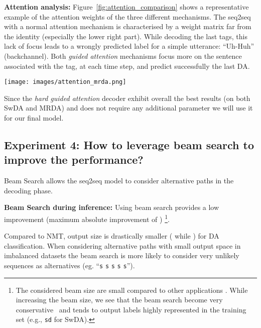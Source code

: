 \documentclass[letterpaper]{article} \usepackage{aaai20}  \usepackage{times}  \usepackage{helvet} \usepackage{courier}  \usepackage[hyphens]{url}  \usepackage{graphicx} \urlstyle{rm} \def\UrlFont{\rm}  \usepackage{graphicx}  \frenchspacing  \setlength{\pdfpagewidth}{8.5in}  \setlength{\pdfpageheight}{11in}
\begin{document}
\noindent\textbf{Attention analysis:} Figure~\ref{fig:attention_comparison} shows a representative example of the attention weights of the three different mechanisms. The seq2seq with a normal attention mechanism is characterised by a weight matrix far from the identity (especially the lower right part). While decoding the last tags, this lack of focus leads to a wrongly predicted label for a simple utterance: ``Uh-Huh'' (backchannel). Both \textit{guided attention} mechanisms focus more on the sentence associated with the tag, at each time step, and predict successfully the last DA.
\begin{figure*}[!htb]
\centering
  \texttt{[image: images/attention\_mrda.png]}
\caption{Attention matrix visualisation on MRDA for the fixed context of 5 utterances. Green color for predicted label indicates a correct label, orange color indicates a mistake. (a) stands for the HGRU with attention, (b) stands for the HGRU with hard guided attention, (c) is HGRU with soft guided attention. }
\label{fig:attention_comparison}
\end{figure*}


Since the \textit{hard guided attention} decoder exhibit overall the best results (on both SwDA and MRDA) and does not require any additional parameter we will use it for our final model.


\subsection{Experiment 4: How to leverage beam search to improve the performance?}
Beam Search allows the seq2seq model to consider alternative paths in the decoding phase.

\noindent\textbf{Beam Search during inference:} Using beam search provides a low improvement (maximum absolute improvement of ) \footnote{The considered beam size are small compared to other applications \cite{mmi}. While increasing the beam size, we see that the beam search become very conservative~\cite{diversity_bea_search} and tends to output labels highly represented in the training set (e.g., \texttt{sd} for SwDA).}.

Compared to NMT, output size is drastically smaller  ( while ) for DA classification. When considering alternative paths with small output space in imbalanced datasets the beam search is more likely to consider very unlikely sequences as alternatives (eg. ``\texttt{s} \texttt{s} \texttt{s} \texttt{s} \texttt{s}''). 
\end{document}
